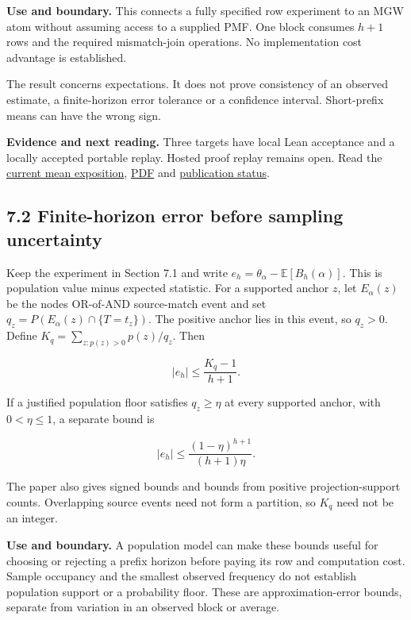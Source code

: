 \documentclass[
  11pt,
  a4paper,
]{article}
\begin{document}
\textbf{Use and boundary.} This connects a fully specified row
experiment to an MGW atom without assuming access to a supplied PMF. One
block consumes \(h+1\) rows and the required mismatch-join operations.
No implementation cost advantage is established.

The result concerns expectations. It does not prove consistency of an
observed estimate, a finite-horizon error tolerance or a confidence
interval. Short-prefix means can have the wrong sign.

\textbf{Evidence and next reading.} Three targets have local Lean
acceptance and a locally accepted portable replay. Hosted proof replay
remains open. Read the
\href{https://github.com/sepahead/pid-rs/blob/main/audit/formal/lean-prefix-mgw-mean/EXPOSITION.current.md}{current
mean exposition},
\href{https://github.com/sepahead/pid-rs/blob/main/output/pdf/prefix-mgw-mean.pdf}{PDF}
and
\href{https://github.com/sepahead/pid-rs/blob/main/audit/formal/lean-prefix-mgw-mean/PUBLICATION.md}{publication
status}.


\subsection{7.2 Finite-horizon error before sampling
uncertainty}\label{72-finite-horizon-error-before-sampling-uncertainty}

Keep the experiment in Section 7.1 and write
\(e_h=\theta_\alpha-\mathbb E[B_h(\alpha)]\). This is population value
minus expected statistic. For a supported anchor \(z\), let
\(E_\alpha(z)\) be the node\textquotesingle s OR-of-AND source-match
event and set \(q_z=P(E_\alpha(z)\cap\{T=t_z\})\). The positive anchor
lies in this event, so \(q_z>0\). Define
\(K_q=\sum_{z:p(z)>0}p(z)/q_z\). Then

\[
|e_h|\le\frac{K_q-1}{h+1}.
\]

If a justified population floor satisfies \(q_z\ge\eta\) at every
supported anchor, with \(0<\eta\le1\), a separate bound is

\[
|e_h|\le\frac{(1-\eta)^{h+1}}{(h+1)\eta}.
\]

The paper also gives signed bounds and bounds from positive
projection-support counts. Overlapping source events need not form a
partition, so \(K_q\) need not be an integer.

\textbf{Use and boundary.} A population model can make these bounds
useful for choosing or rejecting a prefix horizon before paying its row
and computation cost. Sample occupancy and the smallest observed
frequency do not establish population support or a probability floor.
These are approximation-error bounds, separate from variation in an
observed block or average.
\end{document}
